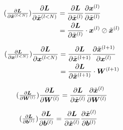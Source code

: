 \documentclass{article}
\newcommand\·{\ensuremath{\cdot}}
\newcommand\…{\ensuremath{\ldots}}
\newcommand\pf[2]{\ensuremath{\frac{\partial {#1}}{\partial {#2}}}}
\newcommand*{\B}[1]{\ifmmode\bm{#1}\else\textbf{#1}\fi}
\newcommand\1{\ensuremath{\mathds{1}}}
\begin{document}
\begin{align*}
  \tag{$\pf{\B{L}}{\tilde{\B{x}}^{(l<N)}}$}
  \pf{\B{L}}{\tilde{\B{x}}^{(l<N)}}
  &= \pf{\B{L}}{\tilde{\B{x}}^{(l)}}\pf{\B{x}^{(l)}}{\tilde{\B{x}}^{(l)}}\\
  &= \pf{\B{L}}{\tilde{\B{x}}^{(l)}}\·\B{x}^{(l)}\oslash\tilde{\B{x}}^{(l)}
\end{align*}

\begin{align*}
  \tag{$\pf{\B{L}}{\B{x}^{(l<N)}}$}
  \pf{\B{L}}{\B{x}^{(l<N)}}
  &= \pf{\B{L}}{\tilde{\B{x}}^{(l+1)}}\pf{\tilde{\B{x}}^{(l+1)}}{\B{x}^{(l)}}\\
  &= \pf{\B{L}}{\tilde{\B{x}}^{(l+1)}}\·\B{W}^{(l+1)}\\
\end{align*}

\begin{align*}
  \tag{$\pf{\B{L}}{\B{W}^{(l)}}$}
  \pf{\B{L}}{\B{W}^{(l)}}
  &= \pf{\B{L}}{\tilde{\B{x}}^{(l)}}\pf{\tilde{\B{x}}^{(l)}}{\B{W}^{(l)}}\\
\end{align*}

\begin{align*}
  \tag{$\pf{\B{L}}{\B{b}^{(l)}}$}
  \pf{\B{L}}{\B{b}^{(l)}}
  &= \pf{\B{L}}{\tilde{\B{x}}^{(l)}}\pf{\tilde{\B{x}}^{(l)}}{\B{b}^{(l)}}
\end{align*}
\end{document}
